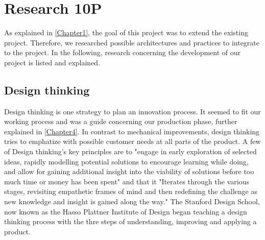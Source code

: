 
\chapter{Research 10P} %

\label{Chapter2} %

As explained in \ref{Chapter1}, the goal of this project was to extend the existing project.
Therefore, we researched possible architectures and practices to integrate to the project.
In the following, research concerning the development of our project is listed and explained.

\section{Design thinking}
Design thinking is one strategy to plan an innovation process. 
It seemed to fit our working process and was a guide concerning our production phase, further explained in \ref{Chapter4}.
In contrast to mechanical improvements, design thinking tries to emphatize with possible customer needs at all parts of the product.
A few of Design thinking's key principles are to 
"engage in early exploration of selected ideas, rapidly modelling potential solutions to encourage learning 
while doing, and allow for gaining additional insight into the viability of 
solutions before too much time or money has been spent" and that it 
"Iterates through the various stages, revisiting empathetic frames of mind and then redefining the challenge as new knowledge and insight is gained along the way." 
\parencite{designThinking}
The Stanford Design School, now known as the Hasso Plattner Institute of Design began teaching a design thinking process 
with the thre steps of understanding, improving and applying a product. 

